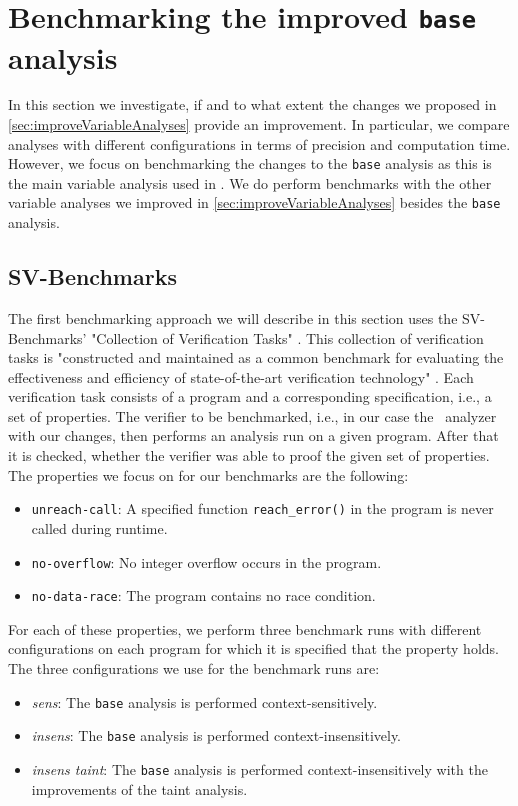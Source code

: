   \section{Benchmarking the improved \texttt{base} analysis}
    In this section we investigate, if and to what extent the changes we proposed in \autoref{sec:improveVariableAnalyses} provide an improvement. In particular, we compare analyses with different configurations in terms of precision and computation time. However, we focus on benchmarking the changes to the \texttt{base} analysis as this is the main variable analysis used in \gob. We do perform benchmarks with the other variable analyses we improved in \autoref{sec:improveVariableAnalyses} besides the \texttt{base} analysis.
    \subsection{SV-Benchmarks}\label{sec:benchSVbench}
      The first benchmarking approach we will describe in this section uses the SV-Benchmarks' "Collection of Verification Tasks" \parencite{svBench}. This collection of verification tasks is "constructed and maintained as a common benchmark for evaluating the effectiveness and efficiency of state-of-the-art verification technology" \parencite{svBench}. Each verification task consists of a program and a corresponding specification, i.e., a set of properties. The verifier to be benchmarked, i.e., in our case the \gob\ analyzer with our changes, then performs an analysis run on a given program. After that it is checked, whether the verifier was able to proof the given set of properties. The properties we focus on for our benchmarks are the following:
      \begin{itemize}
        \item \texttt{unreach-call}: A specified function \texttt{reach\_error()} in the program is never called during runtime.
        \item \texttt{no-overflow}: No integer overflow occurs in the program.
        \item \texttt{no-data-race}: The program contains no race condition.
      \end{itemize}
      For each of these properties, we perform three benchmark runs with different configurations on each program for which it is specified that the property holds.
      The three configurations we use for the benchmark runs are:
      \begin{itemize}
        \item \textit{sens}: The \texttt{base} analysis is performed context-sensitively.
        \item \textit{insens}: The \texttt{base} analysis is performed context-insensitively.
        \item \textit{insens taint}: The \texttt{base} analysis is performed context-insensitively with the improvements of the taint analysis.
      \end{itemize}
